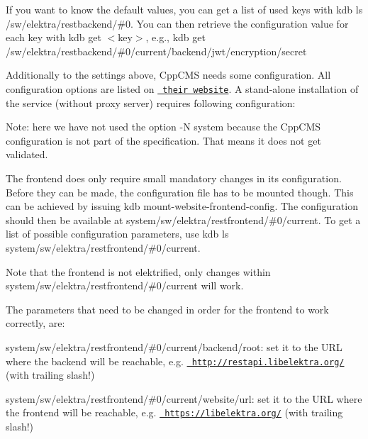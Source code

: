 If you want to know the default values, you can get a list of used keys with {\ttfamily kdb ls /sw/elektra/restbackend/\#0}. You can then retrieve the configuration value for each key with {\ttfamily kdb get $<$key$>$}, e.\+g., {\ttfamily kdb get /sw/elektra/restbackend/\#0/current/backend/jwt/encryption/secret}

Additionally to the settings above, Cpp\+C\+MS needs some configuration. All configuration options are listed on \href{http://cppcms.com/wikipp/en/page/cppcms_1x_config}{\texttt{ their website}}. A stand-\/alone installation of the service (without proxy server) requires following configuration\+:


\begin{DoxyCode}{0}
\end{DoxyCode}


Note\+: here we have not used the option {\ttfamily -\/N system} because the Cpp\+C\+MS configuration is not part of the specification. That means it does not get validated.

The frontend does only require small mandatory changes in its configuration. Before they can be made, the configuration file has to be mounted though. This can be achieved by issuing {\ttfamily kdb mount-\/website-\/frontend-\/config}. The configuration should then be available at {\ttfamily system/sw/elektra/restfrontend/\#0/current}. To get a list of possible configuration parameters, use {\ttfamily kdb ls system/sw/elektra/restfrontend/\#0/current}.

Note that the frontend is not elektrified, only changes within {\ttfamily system/sw/elektra/restfrontend/\#0/current} will work.

The parameters that need to be changed in order for the frontend to work correctly, are\+:


\begin{DoxyItemize}
\item {\ttfamily system/sw/elektra/restfrontend/\#0/current/backend/root}\+: set it to the U\+RL where the backend will be reachable, e.\+g. {\ttfamily \href{http://restapi.libelektra.org/}{\texttt{ http\+://restapi.\+libelektra.\+org/}}} (with trailing slash!)
\item {\ttfamily system/sw/elektra/restfrontend/\#0/current/website/url}\+: set it to the U\+RL where the frontend will be reachable, e.\+g. {\ttfamily \href{https://libelektra.org/}{\texttt{ https\+://libelektra.\+org/}}} (with trailing slash!)
\end{DoxyItemize}

